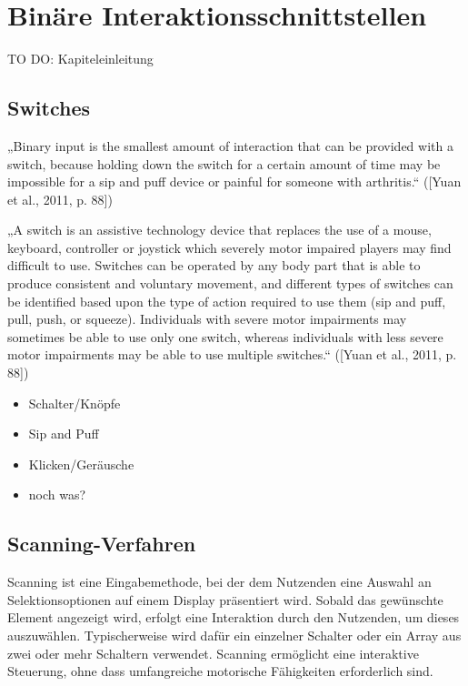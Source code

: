 \section{Binäre Interaktionsschnittstellen}

TO DO: Kapiteleinleitung 

\subsection{Switches}

„Binary input is the smallest amount of interaction that can be provided with a switch, because holding down the switch for a certain amount of time may be impossible for a sip and puff device or painful for someone with arthritis.“ ([Yuan et al., 2011, p. 88])

„A switch is an assistive technology device that replaces the use of a mouse, keyboard, controller or joystick which severely motor impaired players may find difficult to use. Switches can be operated by any body part that is able to produce consistent and voluntary movement, and different types of switches can be identified based upon the type of action required to use them (sip and puff, pull, push, or squeeze). Individuals with severe motor impairments may sometimes be able to use only one switch, whereas individuals with less severe motor impairments may be able to use multiple switches.“ ([Yuan et al., 2011, p. 88])

\begin{itemize}
    \item Schalter/Knöpfe 
    \item Sip and Puff 
    \item Klicken/Geräusche 
    \item noch was? 
\end{itemize}

\subsection{Scanning-Verfahren}
Scanning ist eine Eingabemethode, bei der dem Nutzenden eine Auswahl an Selektionsoptionen auf einem Display präsentiert wird. Sobald das gewünschte Element angezeigt wird, erfolgt eine Interaktion durch den Nutzenden, um dieses auszuwählen. Typischerweise wird dafür ein einzelner Schalter oder ein Array aus zwei oder mehr Schaltern verwendet. Scanning ermöglicht eine interaktive Steuerung, ohne dass umfangreiche motorische Fähigkeiten erforderlich sind.

